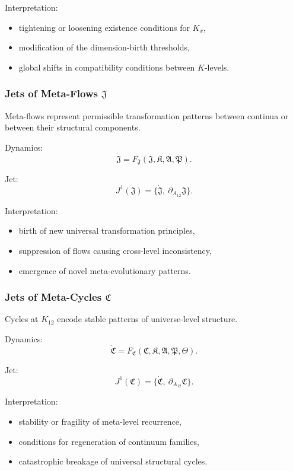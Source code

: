 Interpretation:
\begin{itemize}
    \item tightening or loosening existence conditions for $K_x$,
    \item modification of the dimension-birth thresholds,
    \item global shifts in compatibility conditions between $K$-levels.
\end{itemize}


\subsubsection{Jets of Meta-Flows $\mathfrak{J}$}

Meta-flows represent permissible transformation patterns between
continua or between their structural components.

Dynamics:
\[
\dot{\mathfrak{J}}
=
F_{\mathfrak{J}}(\mathfrak{J},\mathfrak{K},\mathfrak{A},\mathfrak{P}).
\]

Jet:
\[
J^1(\mathfrak{J})
= \{\dot{\mathfrak{J}},\ \partial_{A_{12}}\mathfrak{J}\}.
\]

Interpretation:
\begin{itemize}
    \item birth of new universal transformation principles,
    \item suppression of flows causing cross-level inconsistency,
    \item emergence of novel meta-evolutionary patterns.
\end{itemize}


\subsubsection{Jets of Meta-Cycles $\mathfrak{C}$}

Cycles at $K_{12}$ encode stable patterns of universe-level structure.

Dynamics:
\[
\dot{\mathfrak{C}}
=
F_{\mathfrak{C}}(\mathfrak{C},\mathfrak{K},\mathfrak{A},\mathfrak{P},\mathfrak{\Theta}).
\]

Jet:
\[
J^1(\mathfrak{C})
= \{\dot{\mathfrak{C}},\ \partial_{A_{12}}\mathfrak{C}\}.
\]

Interpretation:
\begin{itemize}
    \item stability or fragility of meta-level recurrence,
    \item conditions for regeneration of continuum families,
    \item catastrophic breakage of universal structural cycles.
\end{itemize}


